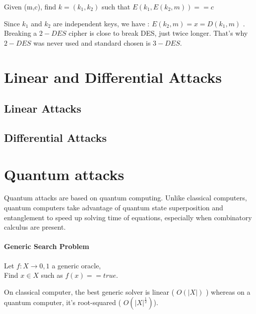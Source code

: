 \begin{mydef}[Challenge :]
\quad \newline
\begin{minipage}[t]{\textwidth}
\flushright	Given (m,c), find $k = (k_1,k_2)$ such that $E(k_1,E(k_2,m)) == c$
\end{minipage}
\end{mydef}

Since $k_1$ and $k_2$ are independent keys, we have : $E(k_2,m) = x = D(k_1,m) $ . Breaking a $2-DES$ cipher is close to break DES, just twice longer. That's why $2-DES$ was never used and standard chosen is $3-DES$.

\section{Linear and Differential Attacks}

\subsection{Linear Attacks}
\subsection{Differential Attacks}


\section{Quantum attacks}

Quantum attacks are based on quantum computing. Unlike classical computers, quantum computers take advantage of quantum state superposition and entanglement to speed up solving time of equations, especially when combinatory calculus are present.

\paragraph{Generic Search Problem}

\begin{mydef}
\begin{minipage}[t]{0.8\textwidth}
    Let $f : X \rightarrow {0,1}$ a generic oracle, \\
  	Find $x \in X$ such as $ f(x) == true $.
\end{minipage}
\end{mydef}

On classical computer, the best generic solver is linear ( $O(|X|)$ ) whereas on a quantum computer, it's root-squared ( $O(|X|^{\frac{1}{2}})$).


